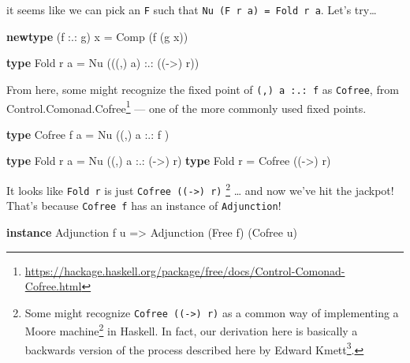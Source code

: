 \documentclass[]{article}
\newenvironment{Shaded}{}{}
\newcommand{\DataTypeTok}[1]{\textcolor[rgb]{0.56,0.13,0.00}{#1}}
\newcommand{\KeywordTok}[1]{\textcolor[rgb]{0.00,0.44,0.13}{\textbf{#1}}}
\newcommand{\NormalTok}[1]{#1}
\newcommand{\OperatorTok}[1]{\textcolor[rgb]{0.40,0.40,0.40}{#1}}
\newcommand{\OtherTok}[1]{\textcolor[rgb]{0.00,0.44,0.13}{#1}}
\renewcommand{\href}[2]{#2\footnote{\url{#1}}}
\begin{document}
it seems like we can pick an \texttt{F} such that
\texttt{Nu\ (F\ r\ a)\ =\ Fold\ r\ a}. Let's try\ldots{}

\begin{Shaded}
\begin{Highlighting}[]
\KeywordTok{newtype}\NormalTok{ (f }\OperatorTok{:.:}\NormalTok{ g) x }\OtherTok{=} \DataTypeTok{Comp}\NormalTok{ (f (g x))}

\KeywordTok{type} \DataTypeTok{Fold}\NormalTok{ r a }\OtherTok{=} \DataTypeTok{Nu}\NormalTok{ (((,) a) }\OperatorTok{:.:}\NormalTok{ ((}\OtherTok{{-}\textgreater{}}\NormalTok{) r))}
\end{Highlighting}
\end{Shaded}

From here, some might recognize the fixed point of \texttt{(,)\ a\ :.:\ f} as
\texttt{Cofree}, from
\href{https://hackage.haskell.org/package/free/docs/Control-Comonad-Cofree.html}{Control.Comonad.Cofree}
--- one of the more commonly used fixed points.

\begin{Shaded}
\begin{Highlighting}[]
\KeywordTok{type} \DataTypeTok{Cofree}\NormalTok{ f a }\OtherTok{=} \DataTypeTok{Nu}\NormalTok{ ((,) a }\OperatorTok{:.:}\NormalTok{ f     )}

\KeywordTok{type} \DataTypeTok{Fold}\NormalTok{ r a   }\OtherTok{=} \DataTypeTok{Nu}\NormalTok{ ((,) a }\OperatorTok{:.:}\NormalTok{ (}\OtherTok{{-}\textgreater{}}\NormalTok{) r)}
\KeywordTok{type} \DataTypeTok{Fold}\NormalTok{ r     }\OtherTok{=} \DataTypeTok{Cofree}\NormalTok{ ((}\OtherTok{{-}\textgreater{}}\NormalTok{) r)}
\end{Highlighting}
\end{Shaded}

It looks like \texttt{Fold\ r} is just \texttt{Cofree\ ((-\textgreater{})\ r)}
\footnote{Some might recognize \texttt{Cofree\ ((-\textgreater{})\ r)} as a
  common way of implementing a
  \href{https://en.wikipedia.org/wiki/Moore_machine}{Moore machine} in Haskell.
  In fact, our derivation here is basically a backwards version of
  \href{https://www.schoolofhaskell.com/user/edwardk/moore/for-less}{the process
  described here by Edward Kmett}.} \ldots{} and now we've hit the jackpot!
That's because \texttt{Cofree\ f} has an instance of \texttt{Adjunction}!

\begin{Shaded}
\begin{Highlighting}[]
\KeywordTok{instance} \DataTypeTok{Adjunction}\NormalTok{ f u }\OtherTok{=\textgreater{}} \DataTypeTok{Adjunction}\NormalTok{ (}\DataTypeTok{Free}\NormalTok{ f) (}\DataTypeTok{Cofree}\NormalTok{ u)}
\end{Highlighting}
\end{Shaded}
\end{document}
